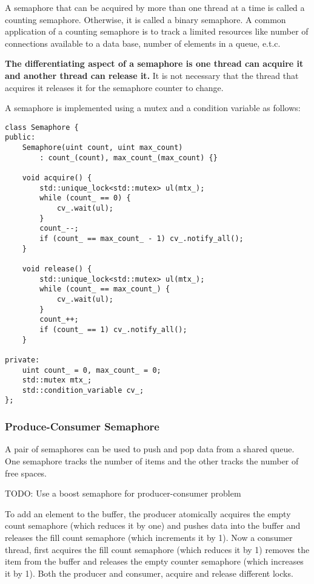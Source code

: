 \documentclass{scrartcl}
\begin{document}
A semaphore that can be acquired by more than one thread at a time is called a counting semaphore. Otherwise, it is called a binary semaphore. A common application of a counting semaphore is to track a limited resources like number of connections available to a data base, number of elements in a queue, e.t.c.

\textbf{The differentiating aspect of a semaphore is one thread can acquire it and another thread can release it.} It is not necessary that the thread that acquires it releases it for the semaphore counter to change.

A semaphore is implemented using a mutex and a condition variable as follows:

\begin{verbatim}
class Semaphore {
public:
    Semaphore(uint count, uint max_count) 
        : count_(count), max_count_(max_count) {}

    void acquire() {
        std::unique_lock<std::mutex> ul(mtx_);
        while (count_ == 0) {
            cv_.wait(ul);
        }
        count_--;
        if (count_ == max_count_ - 1) cv_.notify_all();
    }

    void release() {
        std::unique_lock<std::mutex> ul(mtx_);
        while (count_ == max_count_) {
            cv_.wait(ul);
        }
        count_++;
        if (count_ == 1) cv_.notify_all();
    }

private:
    uint count_ = 0, max_count_ = 0;
    std::mutex mtx_;
    std::condition_variable cv_;
};
\end{verbatim}

\subsubsection{Produce-Consumer Semaphore} A pair of semaphores can be used to push and pop data from a shared queue. One semaphore tracks the number of items and the other tracks the number of free spaces. 

TODO: Use a boost semaphore for producer-consumer problem

To add an element to the buffer, the producer atomically acquires the empty count semaphore (which reduces it by one) and pushes data into the buffer and releases the fill count semaphore (which increments it by 1). Now a consumer thread, first acquires the fill count semaphore (which reduces it by 1) removes the item from the buffer and releases the empty counter semaphore (which increases it by 1). Both the producer and consumer, acquire and release different locks. 
\end{document}
